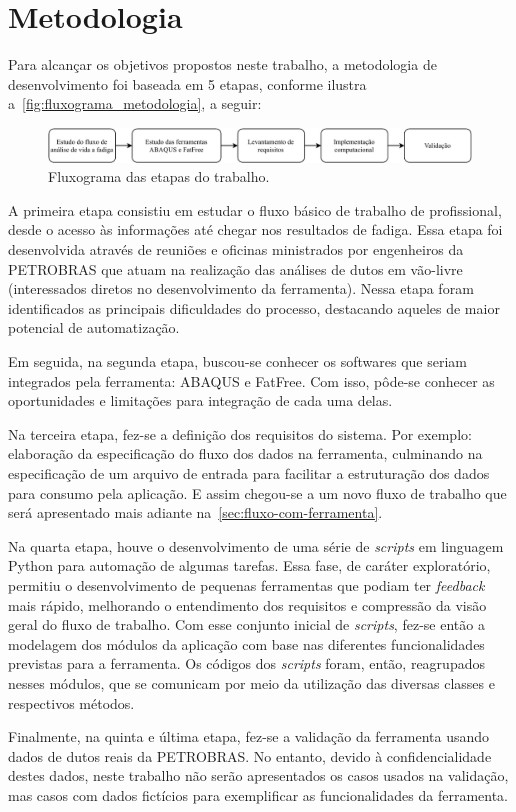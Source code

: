 \thispagestyle{simple}
\chapter{Metodologia}\label{chap:metodologia}

Para alcançar os objetivos propostos neste trabalho, a metodologia de desenvolvimento foi baseada em 5 etapas, conforme ilustra a~\autoref{fig:fluxograma_metodologia}, a seguir:

\begin{figure}[!ht]
    \centering
    \caption{Fluxograma das etapas do trabalho.}\label{fig:fluxograma_metodologia}
    \includegraphics[width=\textwidth]{imagens/fluxograma_metodologia}
\end{figure}

A primeira etapa consistiu em estudar o fluxo básico de trabalho de profissional, desde o acesso às informações até chegar nos resultados de fadiga. Essa etapa foi desenvolvida através de reuniões e oficinas ministrados por engenheiros da PETROBRAS que atuam na realização das análises de dutos em vão-livre (interessados diretos no desenvolvimento da ferramenta). Nessa etapa foram identificados as principais dificuldades do processo, destacando aqueles de maior potencial de automatização.

Em seguida, na segunda etapa, buscou-se conhecer os softwares que seriam integrados pela ferramenta: ABAQUS e FatFree. Com isso, pôde-se conhecer as oportunidades e limitações para integração de cada uma delas.

Na terceira etapa, fez-se a definição dos requisitos do sistema. Por exemplo: elaboração da especificação do fluxo dos dados na ferramenta, culminando na especificação de um arquivo de entrada para facilitar a estruturação dos dados para consumo pela aplicação. E assim chegou-se a um novo fluxo de trabalho que será apresentado mais adiante na~\autoref{sec:fluxo-com-ferramenta}.

Na quarta etapa, houve o desenvolvimento de uma série de \textit{scripts} em linguagem Python para automação de algumas tarefas.
Essa fase, de caráter exploratório, permitiu o desenvolvimento de pequenas ferramentas que podiam ter \textit{feedback} mais rápido, melhorando o entendimento dos requisitos e compressão da visão geral do fluxo de trabalho.
Com esse conjunto inicial de \textit{scripts}, fez-se então a modelagem dos módulos da aplicação com base nas diferentes funcionalidades previstas para a ferramenta.
Os códigos dos \textit{scripts} foram, então, reagrupados nesses módulos, que se comunicam por meio da utilização das diversas classes e respectivos métodos.

Finalmente, na quinta e última etapa, fez-se a validação da ferramenta usando dados de dutos reais da PETROBRAS\@.
No entanto, devido à confidencialidade destes dados, neste trabalho não serão apresentados os casos usados na validação, mas casos com dados fictícios para exemplificar as funcionalidades da ferramenta.